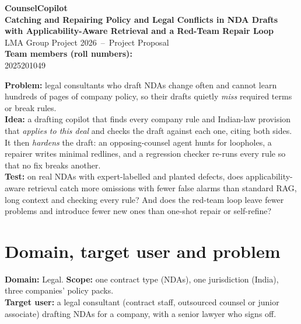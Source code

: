 \documentclass[11pt,a4paper]{article}
\begin{document}
\begin{center}
{\LARGE\bfseries\color{accent} CounselCopilot}\\[3pt]
{\Large\bfseries\color{accent} Catching and Repairing Policy and Legal Conflicts in NDA Drafts\\[1pt]
with Applicability-Aware Retrieval and a Red-Team Repair Loop}\\[6pt]
{\large LMA Group Project 2026 \,--\, Project Proposal}\\[3pt]
\textbf{Team members (roll numbers):}\\[1pt]
2025201049   
\end{center}

\begin{keybox}[title=Summary in three lines]
\textbf{Problem:} legal consultants who draft NDAs change often and cannot learn hundreds of pages of company policy, so their drafts quietly \emph{miss} required terms or break rules.\\
\textbf{Idea:} a drafting copilot that finds every company rule and Indian-law provision that \emph{applies to this deal} and checks the draft against each one, citing both sides. It then \emph{hardens} the draft: an opposing-counsel agent hunts for loopholes, a repairer writes minimal redlines, and a regression checker re-runs every rule so that no fix breaks another.\\
\textbf{Test:} on real NDAs with expert-labelled and planted defects, does applicability-aware retrieval catch more omissions with fewer false alarms than standard RAG, long context and checking every rule? And does the red-team loop leave fewer problems and introduce fewer new ones than one-shot repair or self-refine?
\end{keybox}

\section{Domain, target user and problem}
\textbf{Domain:} Legal. \textbf{Scope:} one contract type (NDAs), one jurisdiction (India), three companies' policy packs.\\
\textbf{Target user:} a legal consultant (contract staff, outsourced counsel or junior associate) drafting NDAs for a company, with a senior lawyer who signs off.
\end{document}
